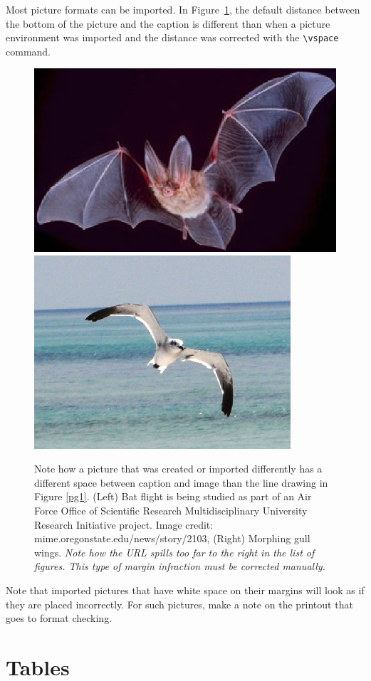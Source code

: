 Most picture formats can be imported. In Figure~\ref{batgull2},
the default distance between the bottom of the picture and the
caption is different than when a picture environment was imported
and the distance was corrected with the \verb+\vspace+ command.



\begin{figure}[hbt] %
\begin{center}
\includegraphics[width=.45\linewidth]{figs/bat_b.eps}\hspace*{0.04in}
\includegraphics[width=.36\linewidth]{figs/gull2_b.eps}\\
\end{center}
\vspace{-.1in}

\caption
{
Note how a picture that was created or imported differently has a different
space between caption and image than the line drawing in Figure
\protect\ref{pg1}. (Left) Bat flight is being studied as part of an
Air Force Office of Scientific Research Multidisciplinary
University Research Initiative project.
Image credit: mime.oregonstate.edu/news/story/2103, (Right)
Morphing gull wings.
{\em Note how the URL spills too far to the right in the
list of figures. This type of margin infraction must be
corrected manually.}}
\label{batgull2}
\end{figure}



Note that imported pictures that have white space on their margins
will look
as if they are placed incorrectly. For such pictures,
make a note on the printout that goes to format checking.



\section{Tables}


